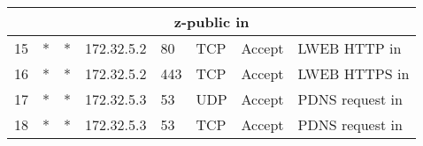\documentclass[a4paper, 11pt, oneside]{article}
\begin{document}
\begin{table}[H]
{\begin{tabular}{|llllllll|}
\multicolumn{8}{|c|}{{\color[HTML]{FE0000} z-public in}}                                                                                                                                                                                                                                                                                                                                                                                                                                                                 \\ \hline
\multicolumn{1}{|l|}{15}          & \multicolumn{1}{l|}{*}                                                            & \multicolumn{1}{l|}{*}                                                              & \multicolumn{1}{l|}{172.32.5.2}                                                        & \multicolumn{1}{l|}{80}                                                                  & \multicolumn{1}{l|}{TCP}               & \multicolumn{1}{l|}{Accept}          & LWEB HTTP in                           \\ \hline
\multicolumn{1}{|l|}{16}          & \multicolumn{1}{l|}{*}                                                            & \multicolumn{1}{l|}{*}                                                              & \multicolumn{1}{l|}{172.32.5.2}                                                        & \multicolumn{1}{l|}{443}                                                                 & \multicolumn{1}{l|}{TCP}               & \multicolumn{1}{l|}{Accept}          & LWEB HTTPS in                          \\ \hline
\multicolumn{1}{|l|}{17}          & \multicolumn{1}{l|}{*}                                                            & \multicolumn{1}{l|}{*}                                                              & \multicolumn{1}{l|}{172.32.5.3}                                                        & \multicolumn{1}{l|}{53}                                                                  & \multicolumn{1}{l|}{UDP}               & \multicolumn{1}{l|}{Accept}          & PDNS request in                        \\ \hline
\multicolumn{1}{|l|}{18}          & \multicolumn{1}{l|}{*}                                                            & \multicolumn{1}{l|}{*}                                                              & \multicolumn{1}{l|}{172.32.5.3}                                                        & \multicolumn{1}{l|}{53}                                                                  & \multicolumn{1}{l|}{TCP}               & \multicolumn{1}{l|}{Accept}          & PDNS request in                        \\ \hline

\end{tabular}}
\end{table}
\end{document}
